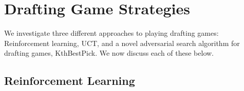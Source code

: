 \documentclass[letterpaper]{article}
\numberwithin{equation}{section}
\numberwithin{theorem}{section}
\numberwithin{lemma}{section}
\numberwithin{df}{section}
\begin{document}
%
%

\section{Drafting Game Strategies}
\label{sec:drafting}

We investigate three different approaches to playing drafting games: Reinforcement learning, UCT, and a novel adversarial search algorithm for drafting games, KthBestPick.  We now discuss each of these below.

\subsection{Reinforcement Learning}
\end{document}
